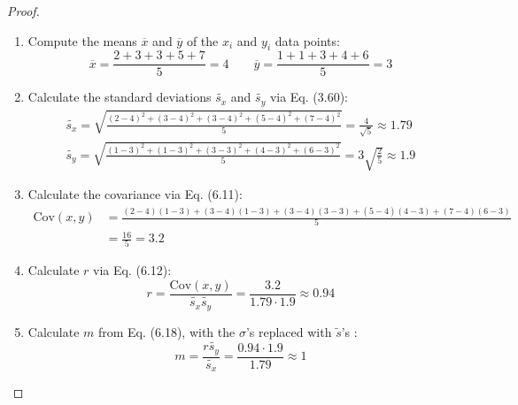 \begin{proof}
    \hfill
    \begin{enumerate}[1.]
        \item Compute the means $\overline{x}$ and $\overline{y}$ of the $x_i$ and 
             $y_i$ data points:
             \[
                 \overline{x} = \frac{2 + 3 + 3 + 5 + 7}{5} = 4
                 \hspace{2em}
                 \overline{y} = \frac{1 + 1 + 3 + 4 + 6}{5} = 3
             \] 

         \item Calculate the standard deviations $\widetilde{s_x}$ and $\widetilde{s_y}$ via 
             Eq. (3.60):
             \begin{align*}
                 \widetilde{s_x} = \sqrt{\frac{(2 - 4)^2 + (3 - 4)^2 + (3 - 4)^2 + (5 - 4)^2 + (7 - 4)^2}{5}} 
                    = \frac{4}{\sqrt{5}} \approx 1.79 \\
                \widetilde{s_y} = \sqrt{\frac{(1 - 3)^2 + (1 - 3)^2 + (3 - 3)^2 + (4 - 3)^2 + (6 - 3)^2}{5}}
                    = 3 \sqrt{\frac{2}{5}} \approx 1.9
             \end{align*}
            
        \item Calculate the covariance via Eq. (6.11):
            \begin{align*}
                \text{Cov}(x, y) 
                &= \frac{(2 - 4)(1 - 3) + (3 - 4)(1 - 3) + 
                    (3 - 4)(3 - 3) + (5 - 4)(4 - 3) + (7 - 4)(6 - 3)}{5} \\
                &= \frac{16}{5} = 3.2
            \end{align*}

        \item Calculate $r$ via Eq. (6.12):
            \[
                r = \frac{\text{Cov}(x, y)}{\widetilde{s_x}\widetilde{s_y}}
                = \frac{3.2}{1.79 \cdot 1.9} \approx 0.94
            \] 

        \item Calculate $m$ from Eq. (6.18), with the $\sigma$'s replaced with $\widetilde{s}$'s :
            \[
                m = \frac{r\widetilde{s_y}}{\widetilde{s_x}} 
                = \frac{0.94 \cdot 1.9}{1.79} \approx 1
            \] 
        \end{enumerate}
        \begin{figure}[H]     
        \end{figure}
\end{proof}

